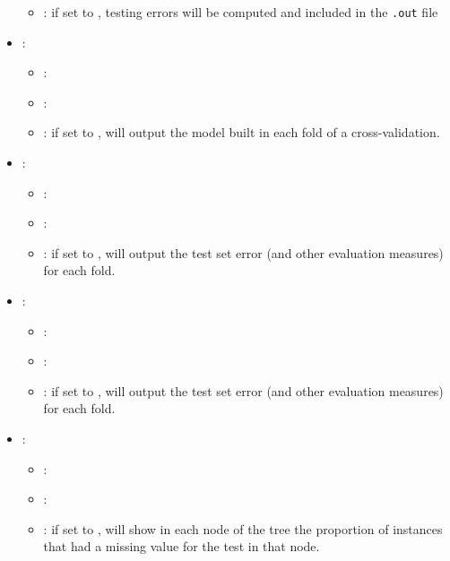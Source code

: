 \begin{itemize}
\begin{itemize}
                \item \optionDescrption{}: if set to , testing errors will be computed and included in the \texttt{.out} file
           \end{itemize}
    \item {}:
           \begin{itemize}
                \item \optionPossibleValues{}: 
                \item \optionDefaultValue{}: 
                \item \optionDescrption{}: if set to , \clus{} will output the model built in each fold of a cross-validation.
           \end{itemize}
    \item {}:
           \begin{itemize}
                \item \optionPossibleValues{}: 
                \item \optionDefaultValue{}: 
                \item \optionDescrption{}:  if set to , \clus{} will output the test set error (and other evaluation measures) for each fold.
           \end{itemize}
    \item {}:
           \begin{itemize}
                \item \optionPossibleValues{}: 
                \item \optionDefaultValue{}: 
                \item \optionDescrption{}: if set to , \clus{} will output the test set error (and other evaluation measures) for each fold.
           \end{itemize}
    \item {}:
           \begin{itemize}
                \item \optionPossibleValues{}: 
                \item \optionDefaultValue{}: 
                \item \optionDescrption{}: if set to , \clus{} will show in each node of the tree the proportion of instances that had a missing value for the test in that node.

\end{itemize}
\end{itemize}

